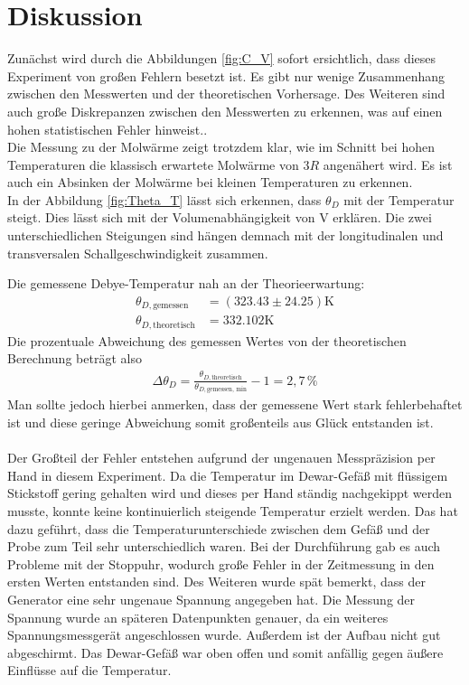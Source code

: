 \section{Diskussion}
\label{sec:Diskussion}
Zunächst wird durch die Abbildungen \ref{fig:C_V} sofort ersichtlich, dass dieses Experiment von großen Fehlern besetzt ist. 
Es gibt nur wenige Zusammenhang zwischen den Messwerten und der theoretischen Vorhersage. Des Weiteren sind 
auch große Diskrepanzen zwischen den Messwerten zu erkennen, was auf einen hohen statistischen Fehler hinweist.. \\
Die Messung zu der Molwärme zeigt trotzdem klar, wie im Schnitt bei hohen Temperaturen die klassisch erwartete Molwärme von $3 R$ angenähert wird. 
Es ist auch ein Absinken der Molwärme bei kleinen Temperaturen zu erkennen.\\
 In der Abbildung \ref{fig:Theta_T} lässt sich erkennen, dass $\theta_D$ mit der Temperatur steigt. Dies lässt sich mit der Volumenabhängigkeit von V erklären. Die zwei unterschiedlichen Steigungen sind hängen demnach mit der longitudinalen und transversalen Schallgeschwindigkeit zusammen. 

Die gemessene Debye-Temperatur nah an der Theorieerwartung:
\begin{align*}
    \theta_{D,\text{gemessen}} &= (323.43 \pm 24.25) \si{\kelvin}\\
    \theta_{D,\text{theoretisch}} &= 332.102 \si{\kelvin}
\end{align*}
Die prozentuale Abweichung des gemessen Wertes von der theoretischen Berechnung beträgt also
\begin{align*}
    \Delta \theta_D =\frac{\theta_{D,\text{theoretisch}}}{\theta_{D,\text{gemessen, min}}} -1 =  2,7 \,\si{\%}
\end{align*}
Man sollte jedoch hierbei anmerken, dass der gemessene Wert stark fehlerbehaftet ist und diese geringe Abweichung somit großenteils aus Glück entstanden ist. \\\\
Der Großteil der Fehler entstehen aufgrund der ungenauen Messpräzision per Hand in diesem Experiment. Da die Temperatur im Dewar-Gefäß mit flüssigem Stickstoff 
gering gehalten wird und dieses per Hand ständig nachgekippt werden musste, konnte keine kontinuierlich steigende Temperatur erzielt werden. 
Das hat dazu geführt, dass die Temperaturunterschiede zwischen dem Gefäß und der Probe zum Teil sehr unterschiedlich waren. 
Bei der Durchführung gab es auch Probleme mit der Stoppuhr, wodurch große Fehler in der Zeitmessung in den ersten Werten entstanden sind. Des Weiteren wurde spät bemerkt, dass der Generator eine sehr ungenaue Spannung angegeben hat. Die Messung der Spannung wurde an späteren Datenpunkten genauer, da ein weiteres Spannungsmessgerät angeschlossen wurde.   
Außerdem ist der Aufbau nicht gut abgeschirmt. Das Dewar-Gefäß war oben offen und somit anfällig gegen äußere Einflüsse auf die Temperatur. 
